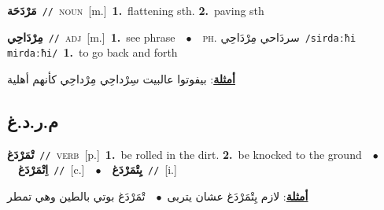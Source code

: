 \documentclass[10pt,a4paper,twoside]{article} %
\begin{document}
\begin{multicols}{2}
{\setlength\topsep{0pt}\textbf{\foreignlanguage{arabic}{مَرْدَحَة}}\ {\color{gray}\texttt{//}\color{black}}\ \textsc{noun}\ [m.]\ \textbf{1.}~flattening sth.  \textbf{2.}~paving sth\ } \vspace{2mm}

{\setlength\topsep{0pt}\textbf{\foreignlanguage{arabic}{مِرْدَاحِي}}\ {\color{gray}\texttt{//}\color{black}}\ \textsc{adj}\ [m.]\ \textbf{1.}~see phrase\ \ $\bullet$\ \ \textsc{ph.} \color{gray} \foreignlanguage{arabic}{سردَاحي مِرْدَاحِي}\color{black}\ {\color{gray}\texttt{/{\sffamily sirdaːħi mirdaːħi}/}\color{black}}\ \textbf{1.}~to go back and forth\  \begin{flushright}\color{gray}\foreignlanguage{arabic}{\textbf{\underline{\foreignlanguage{arabic}{أمثلة}}}: بيفوتوا عالبيت سِرْداحِي مِرْداحِي كأنهم أهلية}\end{flushright}\color{black}} \vspace{2mm}

\vspace{-3mm}
\subsection*{\color{blue}\foreignlanguage{arabic}{م.ر.د.غ}\color{blue}{}} 

{\setlength\topsep{0pt}\textbf{\foreignlanguage{arabic}{تْمَرْدَغ}}\ {\color{gray}\texttt{//}\color{black}}\ \textsc{verb}\ [p.]\ \textbf{1.}~be rolled in the dirt.  \textbf{2.}~be knocked to the ground\ \ $\bullet$\ \ \setlength\topsep{0pt}\textbf{\foreignlanguage{arabic}{اِتْمَرْدَغ}}\ {\color{gray}\texttt{//}\color{black}}\ [c.]\ \ $\bullet$\ \ \setlength\topsep{0pt}\textbf{\foreignlanguage{arabic}{يِتْمَرْدَغ}}\ {\color{gray}\texttt{//}\color{black}}\ [i.]\  \begin{flushright}\color{gray}\foreignlanguage{arabic}{\textbf{\underline{\foreignlanguage{arabic}{أمثلة}}}: لازم يِتْمَرْدَغ عشان يتربى\ $\bullet$\ \  تْمَرْدَغ بوتي بالطين وهي تمطر}\end{flushright}\color{black}} \vspace{2mm}


\end{multicols}
\end{document}
